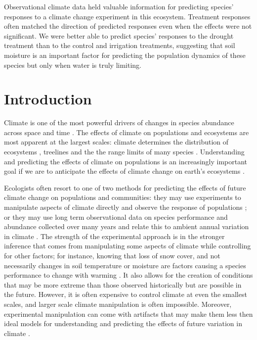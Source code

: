 \documentclass[11pt]{article}
\begin{document}
\begin{doublespace}
Observational climate data held valuable information for predicting species' responses to a climate change experiment in this ecosystem. Treatment responses often matched the direction of predicted responses even when the effects were not significant. We were better able to predict species' responses to the drought treatment than to the control and irrigation treatments, suggesting that soil moisture is an important factor for predicting the population dynamics of these species but only when water is truly limiting.

\section*{Introduction}

Climate is one of the most powerful drivers of changes in species abundance across space and time \citep{post_synchronization_2002,davis_range_2001,walther_ecological_2002}. The effects of climate on populations and ecosystems are most apparent at the largest scales: climate determines the distribution of ecosystems \citep{whittaker_communities_1975}, treelines \citep{korner_alpine_2012} and the the range limits of many species \citep{parmesan_globally_2003,davis_range_2001}. Understanding and predicting the effects of climate on populations is an increasingly important goal if we are to anticipate the effects of climate change on earth's ecosystems \citep{tredennick_we_2016,petchey_ecological_2015,ehrlen_advancing_2016,teller_linking_2016}.
 
Ecologists often resort to one of two methods for predicting the effects of future climate change on populations and communities: they may use experiments to manipulate aspects of climate directly and observe the response of populations \citep{elmendorf_experiment_2015,knapp_pushing_2016,compagnoni_warming_2014}; or they may use long term observational data on species performance and abundance collected over many years and relate this to ambient annual variation in climate  \citep{koons_climate_2012,lunn_demography_2016,dalgleish_climate_2010,jenouvrier_demographic_2009}. The strength of the experimental approach is in the stronger inference that comes from manipulating some aspects of climate while controlling for other factors; for instance, knowing that loss of snow cover, and not necessarily changes in soil temperature or moisture are factors causing a species performance to change with warming \citep{compagnoni_warming_2014}. It also allows for the creation of conditions that may be more extreme than those observed historically \cite{knapp_pushing_2016} but are possible in the future. However, it is often expensive to control climate at even the smallest scales, and larger scale climate manipulation is often impossible.  Moreover, experimental manipulation can come with artifacts that may make them less then ideal models for understanding and predicting the effects of future variation in climate \citep{wolkovich_warming_2012}. 


\end{doublespace}
\end{document}
